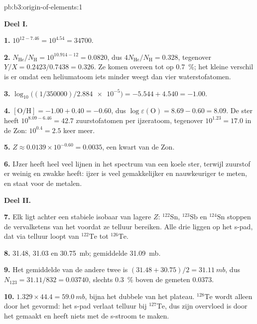 \begin{solution}{pb:b3:origin-of-elements:1}

\textbf{Deel I.}

\textbf{1.} $10^{12 - 7.46} = 10^{4.54} = \num{34700}$.

\textbf{2.} $N_\mathrm{He}/N_\mathrm{H} = 10^{10.914 - 12} = \num{0.0820}$, dus
$4N_\mathrm{He}/N_\mathrm{H} = \num{0.328}$, tegenover $Y/X =
0.2423/0.7438 = \num{0.326}$. Ze komen overeen tot op \qty{0.7}{\percent}; het
kleine verschil is er omdat een heliumatoom iets minder weegt dan vier
waterstofatomen.

\textbf{3.} $\log_{10}\bigl((1/350000)/\num{2.884e-5}\bigr) = -5.544 + 4.540 =
-1.00$.

\textbf{4.} $[\mathrm{O/H}] = -1.00 + 0.40 = -0.60$, dus
$\log\varepsilon(\mathrm{O}) = 8.69 - 0.60 = 8.09$. De ster heeft
$10^{8.09 - 6.46} = 42.7$ zuurstofatomen per ijzeratoom, tegenover
$10^{1.23} = 17.0$ in de Zon: $10^{0.4} = 2.5$ keer meer.

\textbf{5.} $Z \approx 0.0139\times10^{-0.60} = \num{0.0035}$, een kwart van de
Zon.

\textbf{6.} IJzer heeft heel veel lijnen in het spectrum van een koele ster, terwijl
zuurstof er weinig en zwakke heeft: ijzer is veel gemakkelijker en
nauwkeuriger te meten, en staat voor de metalen.

\textbf{Deel II.}

\textbf{7.} Elk ligt achter een stabiele isobaar van lagere $Z$:
$^{122}\mathrm{Sn}$, $^{123}\mathrm{Sb}$ en $^{124}\mathrm{Sn}$ stoppen
de vervalketens van het  voordat ze telluur bereiken. Alle drie liggen
op het s-pad, dat via telluur loopt van $^{122}\mathrm{Te}$ tot
$^{126}\mathrm{Te}$.

\textbf{8.} \num{31.48}, \num{31.03} en \qty{30.75}{mb}; gemiddelde
\qty{31.09}{mb}.

\textbf{9.} Het gemiddelde van de andere twee is $(31.48 + 30.75)/2 = \qty{31.11}{mb}$,
dus $N_{123} = 31.11/832 = \num{0.03740}$, slechts \qty{0.3}{\percent}
boven de gemeten \num{0.0373}.

\textbf{10.} $1.329\times44.4 = \qty{59.0}{mb}$, bijna het dubbele van het plateau.
$^{128}\mathrm{Te}$ wordt alleen door het  gevormd: het s-pad verlaat telluur bij
$^{127}\mathrm{Te}$, dus zijn overvloed is door het  gemaakt en
heeft niets met de s-stroom te maken.


\end{solution}
